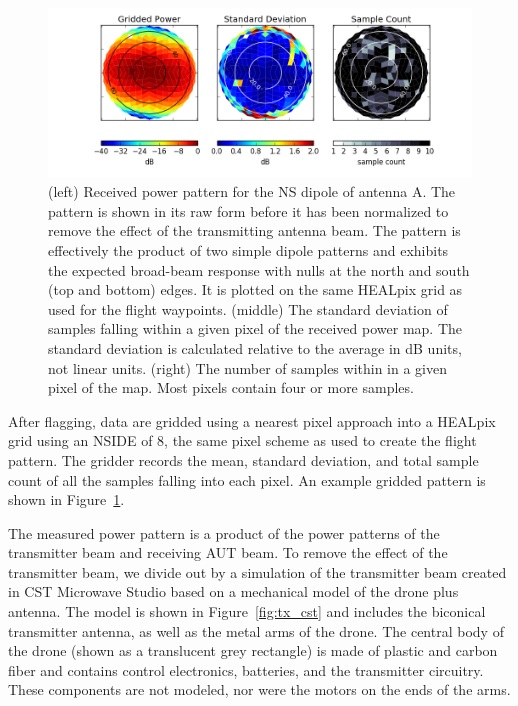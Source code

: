 \documentclass[preprint2,numberedappendix,tighten,twocolappendix]{aastex6}
\begin{document}
\begin{figure}[ht]
\begin{center}
\includegraphics[width=\textwidth]{figures/GB_power_rms_count.png}
\caption{(left) Received power pattern for the NS dipole of antenna A.  The pattern is shown in its raw form before it has been normalized to remove the effect of the transmitting antenna beam.  The pattern is effectively the product of two simple dipole patterns and exhibits the expected broad-beam response with nulls at the north and south (top and bottom) edges.  It is plotted on the same HEALpix grid as used for the flight waypoints.   (middle) The standard deviation of samples falling within a given pixel of the received power map. The standard deviation is calculated relative to the average in dB units, not linear units.  (right) The number of samples within in a given pixel of the map. Most pixels contain four or more samples.}
\label{fig:beam_std_count}
\end{center}
\end{figure}

After flagging, data are gridded using a nearest pixel approach into a HEALpix grid using an NSIDE of 8, the same pixel scheme as used to create the flight pattern.  The gridder records the mean, standard deviation, and total sample count of all the samples falling into each pixel. An example gridded pattern is shown in Figure~\ref{fig:beam_std_count}.

The measured power pattern is a product of the power patterns of the transmitter beam and receiving AUT beam. To remove the effect of the transmitter beam, we divide out by a simulation of the transmitter beam created in CST Microwave Studio based on a mechanical model of the drone plus antenna. The model is shown in Figure~\ref{fig:tx_cst} and includes the biconical transmitter antenna, as well as the metal arms of the drone.  The central body of the drone (shown as a translucent grey rectangle) is made of plastic and carbon fiber and contains control electronics, batteries, and the transmitter circuitry. These components are not modeled, nor were the motors on the ends of the arms.   
\end{document}
